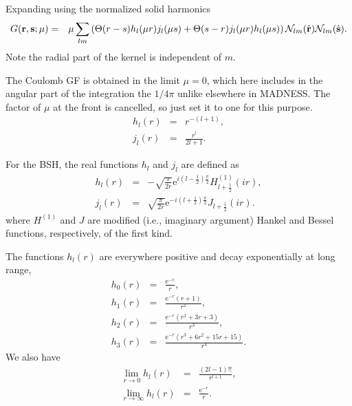 \documentclass[12pt]{article}
\newcommand{\N}{\mathcal{N}}
\newcommand{\rv}{\vb{r}}
\newcommand{\sv}{\vb{s}}
\newcommand{\rhat}{\hat{\rv}}
\newcommand{\shat}{\hat{\sv}}
\begin{document}
Expanding using the normalized solid harmonics
\begin{eqnarray}
  G(\rv,\sv; \mu) & = & \mu 
  \sum_{lm}
  \left(    
  \Theta(r-s) h_l(\mu r) j_l(\mu s)
  +
  \Theta(s-r) j_l(\mu r) h_l(\mu s)
  \right)
  \N_{lm}(\rhat) \N_{lm}(\shat) .
\end{eqnarray}
Note the radial part of the kernel is independent of $m$.

The Coulomb GF is obtained in the limit $\mu=0$, which here includes in the angular part of the integration the $1/4\pi$ unlike elsewhere in MADNESS.  The factor of $\mu$ at the front is cancelled, so just set it to one for this purpose.
\begin{eqnarray}
  h_l(r) & = & r^{-(l+1)} , \\
  j_l(r) & = & \frac{r^l}{2l+1}.
\end{eqnarray}

For the BSH, the real functions $h_l$ and $j_l$ are defined as
\begin{eqnarray}
  h_l(r) & = & -\sqrt{\frac{\pi}{2r}} {\mathrm e}^{i \left(l-\frac{1}{2}\right) \frac{\pi}{2}} H_{l +\frac{1}{2}}^{\left(1\right)} \left(i r  \right) ,\\
  j_l(r) & = & \sqrt{\frac{\pi}{2r}} {\mathrm e}^{-i \left(l+\frac{1}{2}\right) \frac{\pi}{2}} J_{l +\frac{1}{2}} \left(i r  \right) .
\end{eqnarray}
where $H^{(1)}$ and $J$ are modified (i.e., imaginary argument) Hankel and Bessel functions, respectively, of the first kind.

The functions $h_l(r)$ are everywhere positive and decay exponentially at long range,
\begin{eqnarray}
  h_0(r) & = & \frac{{\mathrm e}^{-r}}{r}, \\
  h_1(r) & = & \frac{{\mathrm e}^{-r} \left(r +1\right) }{r^{2}} ,\\
  h_2(r) & = & \frac{{\mathrm e}^{-r} \left(r^{2}+3 r +3\right)}{r^{3}} ,\\
  h_3(r) & = & \frac{{\mathrm e}^{-r} \left(r^{3}+6 r^{2}+15 r +15\right)}{r^{4}} .
\end{eqnarray}
We also have
\begin{eqnarray}
  \lim_{r \rightarrow 0} h_l(r) & = & \frac{(2l-1)!!}{r^{l+1}} , \\
  \lim_{r \rightarrow \infty} h_l(r) & = & \frac{{\mathrm e}^{-r}}{r} .
\end{eqnarray}
\end{document}
